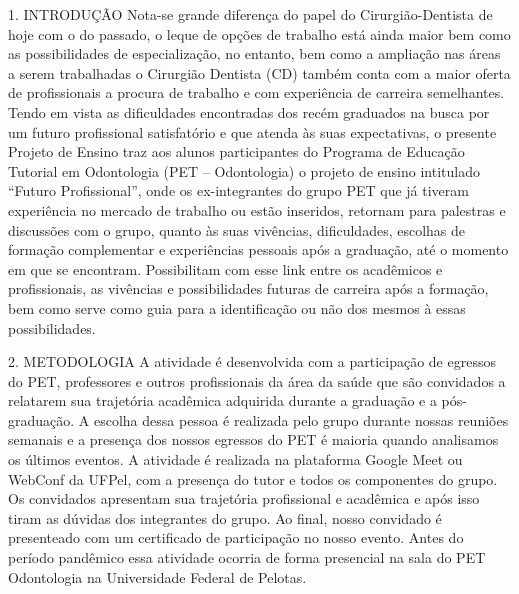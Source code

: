 1. INTRODUÇÃO
Nota-se grande diferença do papel do Cirurgião-Dentista de hoje com o do passado, o leque de  opções de trabalho está ainda maior bem como as possibilidades de especialização, no entanto,  bem como a ampliação nas áreas a serem trabalhadas o Cirurgião Dentista (CD) também conta  com a maior oferta de profissionais a procura de trabalho e com experiência de carreira semelhantes. Tendo em vista as dificuldades encontradas dos recém graduados na busca por um futuro  profissional satisfatório e que atenda às suas expectativas, o presente Projeto de Ensino traz aos alunos participantes do Programa de Educação Tutorial em Odontologia (PET – Odontologia) o  projeto de ensino intitulado “Futuro Profissional”, onde os ex-integrantes do grupo PET que já  tiveram experiência no mercado de trabalho ou estão inseridos, retornam para palestras e discussões com o grupo, quanto às suas vivências, dificuldades, escolhas de formação complementar e experiências pessoais após a graduação, até o momento em que se encontram. Possibilitam com esse link entre os acadêmicos e profissionais, as vivências e possibilidades futuras de carreira após a formação, bem como serve como guia para a identificação ou não dos mesmos à essas possibilidades.

2. METODOLOGIA
A atividade é desenvolvida com a participação de egressos do PET, professores e outros profissionais da área da saúde que são convidados a relatarem sua trajetória acadêmica adquirida durante a graduação e a pós-graduação. A escolha dessa pessoa é realizada pelo grupo durante nossas reuniões semanais e a presença dos nossos egressos do PET é maioria quando analisamos os últimos eventos. A atividade é realizada na plataforma Google Meet ou WebConf da UFPel, com a presença do tutor e todos os componentes do grupo. Os convidados apresentam sua trajetória profissional e acadêmica e após isso tiram as dúvidas dos integrantes do grupo. Ao final, nosso convidado é presenteado com um certificado de participação no nosso evento. Antes do período pandêmico essa atividade ocorria de forma presencial na sala do PET Odontologia na Universidade Federal de Pelotas. 

